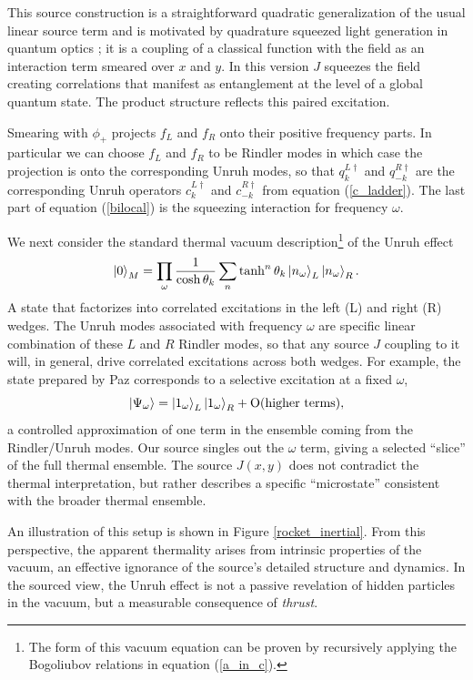 \documentclass[12pt,a4paper]{article}
\begin{document}
This source construction is a straightforward quadratic generalization of the usual linear source term \cite{Schwinger_1966} \cite{ryder1996quantum} and is motivated by quadrature squeezed light generation in quantum optics \cite{gerry2023introductory}; it is a coupling of a classical function with the field as an interaction term smeared over $x$ and $y$. In this version $J$ squeezes the field creating correlations that manifest as entanglement at the level of a global quantum state. The product structure reflects this paired excitation.

Smearing with $\phi_+$ projects $f_L$ and $f_R$ onto their positive frequency parts. In particular we can choose $f_L$ and $f_R$ to be Rindler modes in which case the projection is onto the corresponding Unruh modes, so that $q_{k}^{L\dagger}$ and $q_{-k}^{R\dagger}$ are the corresponding Unruh operators $c_{k}^{L\dagger}$ and $c_{-k}^{R\dagger}$ from equation (\ref{c_ladder}).  The last part of equation (\ref{bilocal}) is the squeezing interaction for frequency $\omega$.

We next consider the standard thermal vacuum description\footnote{The form of this vacuum equation can be proven by recursively applying the Bogoliubov relations in equation (\ref{a_in_c}).} of the Unruh effect
\begin{equation}
  \ket{0}_M = \prod_{\omega} \frac{1}{\cosh{\theta_k}} \sum_n \tanh^n{\theta_k} \ket{n_\omega}_{L} \ket{n_\omega}_{R}.
  \label{vacuum}
\end{equation}
A state that factorizes into correlated excitations in the left (L) and right (R) wedges. The Unruh modes associated with frequency $\omega$ are specific linear combination of these $L$ and $R$ Rindler modes, so that any source $J$ coupling to it will, in general, drive correlated excitations across both wedges. For example, the state prepared by Paz corresponds to a selective excitation at a fixed $\omega$,
\begin{equation}
  \ket{\Psi_\omega} = \ket{1_\omega}_L \ket{1_\omega}_R + \text{O(higher terms)},
  \label{one_fock}
\end{equation}
a controlled approximation of one term in the ensemble coming from the Rindler/Unruh modes. Our source singles out the $\omega$ term, giving a selected ``slice'' of the full thermal ensemble. The source $J(x,y)$ does not contradict the thermal interpretation, but rather describes a specific ``microstate'' consistent with the broader thermal ensemble.

An illustration of this setup is shown in Figure \ref{rocket_inertial}. From this perspective, the apparent thermality arises from intrinsic properties of the vacuum, an effective ignorance of the source's detailed structure and dynamics. In the sourced view, the Unruh effect is not a passive revelation of hidden particles in the vacuum, but a measurable consequence of {\it thrust}.
\end{document}
